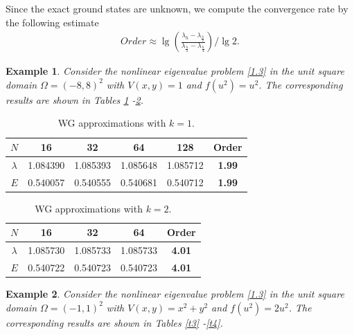 \documentclass[compress, preprint,9pt]{elsarticle}
\numberwithin{equation}{section}
\newtheorem{example}{Example}[section]
\begin{document}
Since the exact ground states are unknown, we compute the convergence rate by the following estimate
\begin{eqnarray*}
	Order\approx\lg\left(\frac{\lambda_h-\lambda_{\frac{h}{2}}}{\lambda_{\frac{h}{2}}-\lambda_{\frac{h}{4}}}\right)/\lg2.
\end{eqnarray*}

\begin{example}
	Consider the nonlinear eigenvalue problem \eqref{1.3} in the unit square domain $\Omega=(-8,8)^2$ with $V(x,y)=1$ and $f(u^2)=u^2$. The corresponding results are shown in Tables \ref{t1} -\ref{t2}.
\end{example}
\begin{table}[ht]
	\centering
	\caption{WG approximations with $k=1$.}
	\label{t1}
	\begin{tabular}{|c|c|c|c|c|c|}\hline
		$N$&16&32&64&128&Order\\ \hline\hline
		$\lambda$& 1.084390 & 1.085393 & 1.085648 & 1.085712 & \textbf{1.99} 
		\\ \hline
		$E$& 0.540057 & 0.540555 & 0.540681 & 0.540712 & \textbf{1.99} 
		\\ \hline
	\end{tabular}
\end{table}
\begin{table}[ht]
	\centering
	\caption{WG approximations with $k=2$.}
	\label{t2}
	\begin{tabular}{|c|c|c|c|c|}\hline
		$N$&16&32&64&Order\\ \hline\hline
		$\lambda$& 1.085730 & 1.085733 & 1.085733 & \textbf{4.01}
		\\ \hline
		$E$& 0.540722 & 0.540723 & 0.540723 & \textbf{4.01} 
		\\ \hline
	\end{tabular}
\end{table}

\begin{example}
	Consider the nonlinear eigenvalue problem \eqref{1.3} in the unit square domain $\Omega=(-1,1)^2$ with $V(x,y)=x^2+y^2$ and $f(u^2)=2 u^2$. The corresponding results are shown in Tables \ref{t3} -\ref{t4}.
\end{example}
\end{document}
